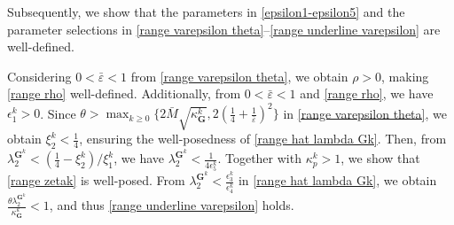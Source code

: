 \documentclass[12pt,draftcls,onecolumn]{IEEEtran}
\newcommand{\bG}{{\mathbf{G}}}
\begin{document}
Subsequently, we show that the parameters in \eqref{epsilon1-epsilon5} and the parameter selections in \eqref{range varepsilon theta}--\eqref{range underline varepsilon} are well-defined.

	Considering $0<\bar{\varepsilon}<1$ from \eqref{range varepsilon theta}, we obtain $\rho>0$, making \eqref{range rho} well-defined. Additionally, from $0<\bar{\varepsilon}<1$ and \eqref{range rho}, we have $\epsilon_1^k>0$. Since $\theta>\max_{k\geq 0}\{2\bar{M}\sqrt{\kappa_\bG^k},2(\frac{1}{4}+\frac{1}{\bar{\varepsilon}})^2\}$ in \eqref{range varepsilon theta}, we obtain ${\xi_2^k}<\frac{1}{4}$, ensuring the well-posedness of \eqref{range hat lambda Gk}. Then, from $\lambda_{2}^{\mathbf{G}^k}<(\frac{1}{4}-{\xi_2^k})/{\xi_1^k}$, we have $\lambda_{2}^{\mathbf{G}^k}<\frac{1}{4\epsilon_{5}^k}$. Together with $\kappa_p^k > 1$, we show that \eqref{range zetak} is well-posed. From $\lambda_{2}^{\mathbf{G}^k}<\frac{\epsilon_3^k}{\epsilon_4^k}$ in \eqref{range hat lambda Gk}, we obtain $\frac{\theta\lambda_2^{\bG^k}}{\kappa_\bG^k}<1$, and thus \eqref{range underline varepsilon} holds.
\end{document}
